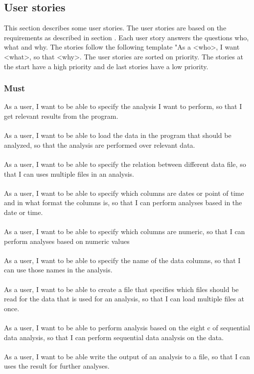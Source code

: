 \subsection{User stories}
This section describes some user stories. The user stories are based on the requirements as described in section . Each user story answers the questions who, what and why. The stories follow the following template "As a <who>, I want <what>, so that <why>. The user stories are sorted on priority. The stories at the start have a high priority and de last stories have a low priority.
\subsubsection{Must}
As a user, I want to be able to specify the analysis I want to perform, so that I get relevant results from the program. 
\\\\
As a user, I want to be able to load the data in the program that should be analyzed, so that the analysis are performed over relevant data. 
\\\\
As a user, I want to be able to specify the relation between different data file, so that I can uses multiple files in an analysis.
\\\\
As a user, I want to be able to specify which columns are dates or point of time and in what format the columns is, so that I can perform analyses based in the date or time.
\\\\
As a user, I want to be able to specify which columns are numeric, so that I can perform analyses based on numeric values
\\\\
As a user, I want to be able to specify the name of the data columns, so that I can use those names in the analysis.
\\\\
As a user, I want to be able to create a file that specifies which files should be read for the data that is used for an analysis, so that I can load multiple files at once.
\\\\
As a user, I want to be able to perform analysis based on the eight c of sequential data analysis, so that I can perform sequential data analysis on the data.
\\\\
As a user, I want to be able write the output of an analysis to a file, so that I can uses the result for further analyses.
